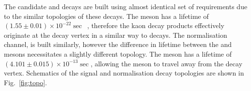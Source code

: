 The candidate \decay{\Bp}{\Dsp\phiz} and \decay{\Bp}{\Dsp\Kp\Km} decays are built using almost identical set of requirements due to the similar topologies of these decays. The \phiz meson has a lifetime of $(1.55\pm0.01)\times10^{-22}\sec$~\cite{PDG2016}, therefore the kaon decay products effectively originate at the \Bp decay vertex in a similar way to \decay{\Bp}{\Dsp\Kp\Km} decays.  The normalisation channel, \decay{\Bp}{\Dsp\Dzb} is built similarly, however the difference in lifetime between the \Dzb and \phiz mesons necessitates a slightly different topology. The \Dzb meson has a lifetime of $(4.101\pm0.015)\times10^{-13}\sec$, allowing the meson to travel away from the \Bp decay vertex. Schematics of the signal and normalisation decay topologies are shown in Fig.~\ref{fig:topo}.

